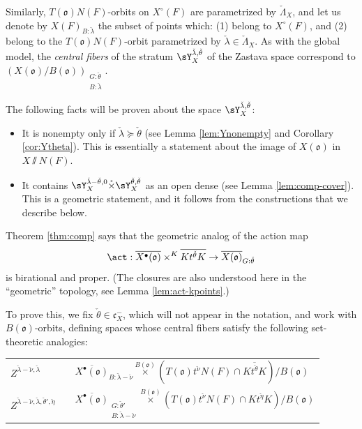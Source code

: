 \documentclass[final]{amsart}
\theoremstyle{remark}
\theoremstyle{definition}
\numberwithin{equation}{section}
\begin{document}
Similarly, $T(\mathfrak o)N(F)$-orbits on $X^\circ(F)$ are parametrized by $\check \Lambda_X$, and let us denote by $X(F)_{B:\check\lambda}$ the subset of points which: (1) belong to $X^\circ (F)$, and (2) belong to the $T(\mathfrak o)N(F)$-orbit parametrized by $\check\lambda\in\check\Lambda_X$. As with the global model, the \emph{central fibers} of the stratum $\sY_X^{\check\lambda,\check\theta}$ of the Zastava space correspond to $(X(\mathfrak o)/B(\mathfrak o))_{\substack{G:\check\theta \\ B:\check\lambda}}$.


The following facts will be proven about the space $\sY_X^{\check\lambda,\check\theta}$:
\begin{itemize}
 \item It is nonempty only if $\check\lambda \succeq \check\theta$ (see Lemma \ref{lem:Ynonempty} and Corollary \ref{cor:Ytheta}). This is essentially a statement about the image of $X(\mathfrak o)$ in $X\sslash N(F)$. 
 \item It contains $\sY_X^{\check\lambda-\check\theta,0} \mathring\times \sY_X^{\check\theta,\check\theta}$ as an open dense (see Lemma \ref{lem:comp-cover}). This is a geometric statement, and it follows from the constructions that we describe below. 
\end{itemize}

Theorem \ref{thm:comp} says that the geometric analog of the action map 
\begin{equation}
 \label{eq:action-sets}
\act: \overline{X^\bullet(\mathfrak o)} \times^{K}  \overline{K t^{\check\theta} K} \to \overline{X(\mathfrak o)}_{G:\check\theta}
\end{equation}
is birational and proper. (The closures are also understood here in the ``geometric'' topology, see Lemma \ref{lem:act-kpoints}.) 

To prove this, we fix $\check\theta \in \mathfrak c_X^-$, which will not appear in the notation, and work with $B(\mathfrak o)$-orbits, defining spaces whose central fibers satisfy the following set-theoretic analogies:
\begin{center}
\begin{tabular}{p{20mm}p{10mm}p{7cm}}
 $Z^{\check\lambda - \check\nu, \check\lambda}$ && $\overline{X^\bullet(\mathfrak o)}_{B:\check\lambda-\check\nu} \overset{B(\mathfrak o)}\times (T(\mathfrak o) t^{\check\nu} N(F) \cap \overline{K t^{\check\theta} K})/B(\mathfrak o)$ \\
 $Z^{\check\lambda - \check\nu, \check\lambda, \check\theta',\check\eta}$ && $\overline{X^\bullet(\mathfrak o)}_{\substack{G:\check\theta' \\ B:\check\lambda-\check\nu}} \overset{B(\mathfrak o)}\times (T(\mathfrak o) t^{\check\nu} N(F) \cap K t^{\check\eta} K)/B(\mathfrak o)$ \\ 
\end{tabular}
\end{center}
\end{document}
